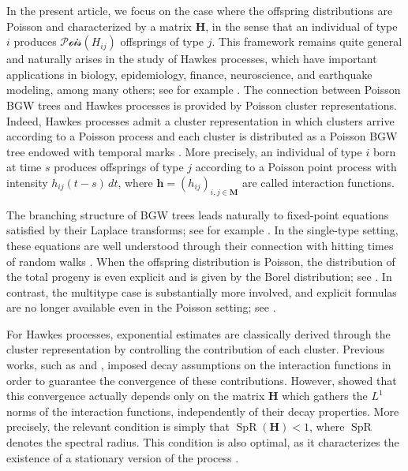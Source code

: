 \documentclass[reqno,final,11pt]{amsart}
\renewcommand{\cite}{\citet}
\theoremstyle{plain}
\theoremstyle{definition}
\theoremstyle{remark}
\newcommand{\M}{\bm{M}}
\newcommand{\h}{\bm{h}}
\renewcommand{\H}{\bm{H}}
\newcommand{\Pois}{\mathscr{P}\!\mathscr{o}\!\mathscr{i}\!\mathscr{s}}
\DeclareMathOperator{\spr}{SpR}
\begin{document}
In the present article, we focus on the case where the offspring distributions are Poisson and characterized by a matrix $\H$, in the sense that an individual of type $i$ produces $\Pois(H_{ij})$ offsprings of type $j$. This framework remains quite general and naturally arises in the study of Hawkes processes, which have important applications in biology, epidemiology, finance, neuroscience, and earthquake modeling, among many others; see for example \cite{hawkes_spectra_1971,ogata_statistical_1988,lambert_reconstructing_2018,bacry_limit_2013}. The connection between Poisson BGW trees and Hawkes processes is provided by Poisson cluster representations. Indeed, Hawkes processes admit a cluster representation in which clusters arrive according to a Poisson process and each cluster is distributed as a Poisson BGW tree endowed with temporal marks \cite{hawkes_cluster_1974}. More precisely, an individual of type $i$ born at time $s$ produces offsprings of type $j$ according to a Poisson point process with intensity $h_{ij}(t-s)\,dt$, where $\h=(h_{ij})_{i,j\in\M}$ are called interaction functions.

The branching structure of BGW trees leads naturally to fixed-point equations satisfied by their Laplace transforms; see for example \cite{dwass_total_1969,good_number_1949,harris_theory_1963}. In the single-type setting, these equations are well understood through their connection with hitting times of random walks \cite{dwass_total_1969,good_number_1949,wang_total_2014}. When the offspring distribution is Poisson, the distribution of the total progeny is even explicit and is given by the Borel distribution; see \cite{bordenave_large_2007,bondesson_class_2004}. In contrast, the multitype case is substantially more involved, and explicit formulas are no longer available even in the Poisson setting; see \cite{karim_compound_2025,karim_exact_2021}.

For Hawkes processes, exponential estimates are classically derived through the cluster representation by controlling the contribution of each cluster. Previous works, such as \cite{reynaud-bouret_non_2007} and \cite{hansen_lasso_2015}, imposed decay assumptions on the interaction functions in order to guarantee the convergence of these contributions. However, \cite{leblanc_exponential_2024} showed that this convergence actually depends only on the matrix $\H$ which gathers the $L^1$ norms of the interaction functions, independently of their decay properties. More precisely, the relevant condition is simply that $\spr(\H)<1$, where $\spr$ denotes the spectral radius. This condition is also optimal, as it characterizes the existence of a stationary version of the process \cite{bremaud_stability_1996}.
\end{document}
